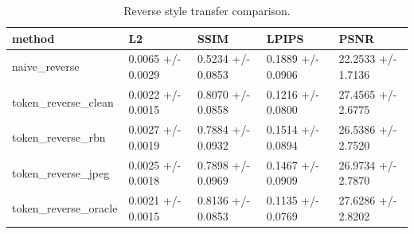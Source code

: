 \begin{table}
\caption{Reverse style transfer comparison.}
\label{tab:reverse}
\begin{tabular}{lllll}
\toprule
method & L2 & SSIM & LPIPS & PSNR \\
\midrule
naive_reverse & 0.0065 +/- 0.0029 & 0.5234 +/- 0.0853 & 0.1889 +/- 0.0906 & 22.2533 +/- 1.7136 \\
token_reverse_clean & 0.0022 +/- 0.0015 & 0.8070 +/- 0.0858 & 0.1216 +/- 0.0800 & 27.4565 +/- 2.6775 \\
token_reverse_rbn & 0.0027 +/- 0.0019 & 0.7884 +/- 0.0932 & 0.1514 +/- 0.0894 & 26.5386 +/- 2.7520 \\
token_reverse_jpeg & 0.0025 +/- 0.0018 & 0.7898 +/- 0.0969 & 0.1467 +/- 0.0909 & 26.9734 +/- 2.7870 \\
token_reverse_oracle & 0.0021 +/- 0.0015 & 0.8136 +/- 0.0853 & 0.1135 +/- 0.0769 & 27.6286 +/- 2.8202 \\
\bottomrule
\end{tabular}
\end{table}
